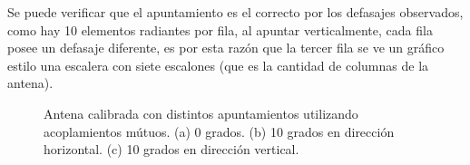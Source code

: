 Se puede verificar que el apuntamiento es el correcto por los defasajes observados, como hay 10 elementos radiantes por fila,
al apuntar verticalmente, cada fila posee un defasaje diferente, es por esta razón que la tercer fila se ve un gráfico estilo 
una escalera con siete escalones (que es la cantidad de columnas de la antena). 
\begin{figure}[H]
	\centering
 	
		\caption{Antena calibrada con distintos apuntamientos utilizando acoplamientos mútuos. (a) 0 grados. (b) 10 grados en 
		dirección horizontal. (c) 10 grados en dirección vertical.}
	\label{fig:nonErrorMutual}
\end{figure}


